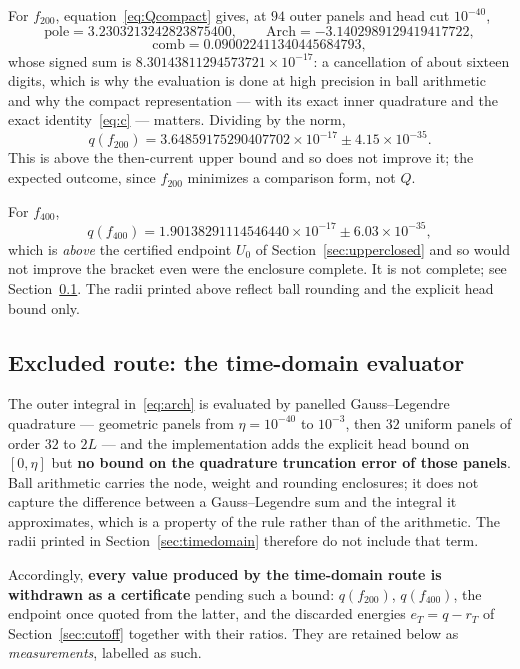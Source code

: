 \documentclass[11pt,a4paper]{article}
\theoremstyle{definition}
\theoremstyle{remark}
\begin{document}
For $f_{200}$, equation~\eqref{eq:Qcompact} gives, at $94$ outer panels and head
cut $10^{-40}$,
\[
  \text{pole} = 3.2303213242823875400,\qquad
  \mathrm{Arch} = -3.1402989129419417722,
\]
\[
  \text{comb} = 0.090022411340445684793,
\]
whose signed sum is $8.30143811294573721\times10^{-17}$: a cancellation of about
sixteen digits, which is why the evaluation is done at high precision in ball
arithmetic and why the compact representation --- with its exact inner
quadrature and the exact identity~\eqref{eq:c} --- matters. Dividing by the norm,
\[
  q(f_{200}) = 3.64859175290407702\times10^{-17} \pm 4.15\times10^{-35}.
\]
This is above the then-current upper bound and so does not improve it; the
expected outcome, since $f_{200}$ minimizes a comparison form, not $Q$.

For $f_{400}$,
\[
  q(f_{400}) = 1.90138291114546440\times10^{-17} \pm 6.03\times10^{-35},
\]
which is \emph{above} the certified endpoint $U_0$ of
Section~\ref{sec:upperclosed} and so would not improve the bracket even were the
enclosure complete. It is not complete; see
Section~\ref{sec:status}. The radii printed above reflect ball rounding and the
explicit head bound only.

\subsection{Excluded route: the time-domain evaluator}
\label{sec:status}

The outer integral in~\eqref{eq:arch} is evaluated by panelled Gauss--Legendre
quadrature --- geometric panels from $\eta = 10^{-40}$ to $10^{-3}$, then $32$
uniform panels of order $32$ to $2L$ --- and the implementation adds the
explicit head bound on $[0,\eta]$ but \textbf{no bound on the quadrature
truncation error of those panels}. Ball arithmetic carries the node, weight and
rounding enclosures; it does not capture the difference between a
Gauss--Legendre sum and the integral it approximates, which is a property of the
rule rather than of the arithmetic. The radii printed in
Section~\ref{sec:timedomain} therefore do not include that term.

Accordingly, \textbf{every value produced by the time-domain route is withdrawn
as a certificate} pending such a bound: $q(f_{200})$, $q(f_{400})$, the endpoint
once quoted from the latter, and the discarded energies
$e_T = q - r_T$ of Section~\ref{sec:cutoff} together with their ratios. They are
retained below as \emph{measurements}, labelled as such.
\end{document}
